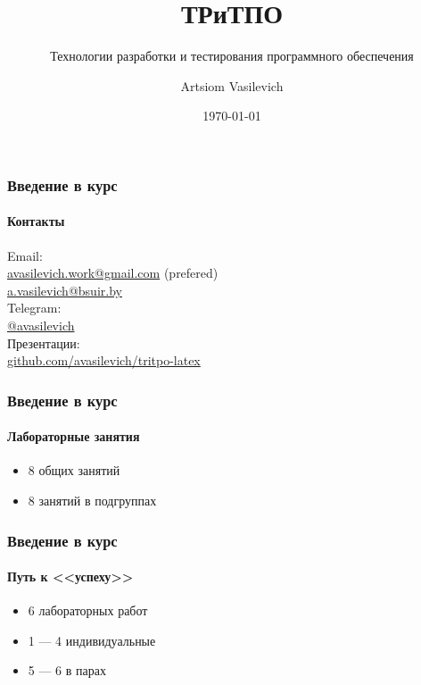 \documentclass[aspectratio=169, 12pt]{beamer}
\title{ТРиТПО}
\subtitle{Технологии разработки и тестирования программного обеспечения}
\author{Artsiom Vasilevich}
\institute[BSUIR]{Belarusian State University of Informatics and Radioelectronics}
\date{\tiny \today}
\begin{document}
\frame{\titlepage}

\begin{frame}[t]
    \frametitle{Введение в курс}
    \framesubtitle{Контакты}
    Email: \\
    \hspace{0.5cm} \href{mailto:avasilevich.work@gmail.com}{avasilevich.work@gmail.com} (prefered) \\
    \hspace{0.5cm} \href{mailto:a.vasilevich@bsuir.by}{a.vasilevich@bsuir.by} \\
    \vspace{\baselineskip}
    Telegram: \\
    \hspace{0.5cm} \href{https://t.me/avasilevich}{@avasilevich} \\
    \vspace{\baselineskip}
    Презентации: \\
    \hspace{0.5cm} \href{https://github.com/avasilevich/tritpo-latex}{github.com/avasilevich/tritpo-latex} \\
\end{frame}

\begin{frame}
    \frametitle{Введение в курс}
    \framesubtitle{Лабораторные занятия}
    \begin{itemize}
        \item 8 общих занятий
        \item 8 занятий в подгруппах
    \end{itemize}
\end{frame}

\begin{frame}
    \frametitle{Введение в курс}
    \framesubtitle{Путь к <<успеху>>}
    \begin{itemize}
        \item 6 лабораторных работ
        \item 1 --- 4 индивидуальные
        \item 5 --- 6 в парах
    \end{itemize}
\end{frame}
\end{document}
